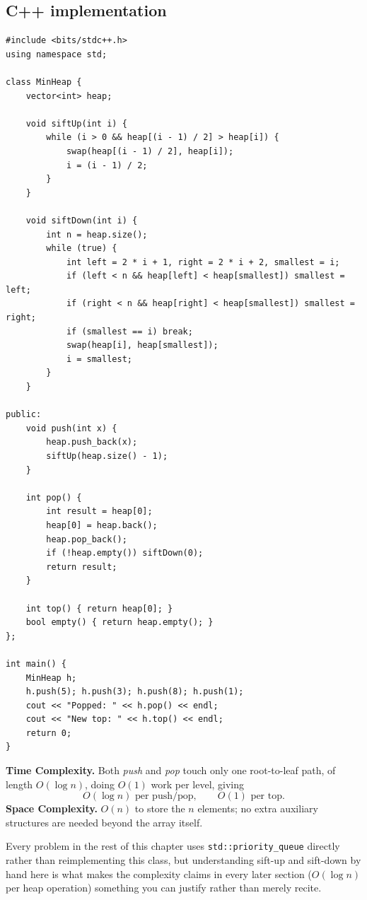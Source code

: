 \subsection*{C++ implementation}

\begin{lstlisting}
#include <bits/stdc++.h>
using namespace std;

class MinHeap {
    vector<int> heap;

    void siftUp(int i) {
        while (i > 0 && heap[(i - 1) / 2] > heap[i]) {
            swap(heap[(i - 1) / 2], heap[i]);
            i = (i - 1) / 2;
        }
    }

    void siftDown(int i) {
        int n = heap.size();
        while (true) {
            int left = 2 * i + 1, right = 2 * i + 2, smallest = i;
            if (left < n && heap[left] < heap[smallest]) smallest = left;
            if (right < n && heap[right] < heap[smallest]) smallest = right;
            if (smallest == i) break;
            swap(heap[i], heap[smallest]);
            i = smallest;
        }
    }

public:
    void push(int x) {
        heap.push_back(x);
        siftUp(heap.size() - 1);
    }

    int pop() {
        int result = heap[0];
        heap[0] = heap.back();
        heap.pop_back();
        if (!heap.empty()) siftDown(0);
        return result;
    }

    int top() { return heap[0]; }
    bool empty() { return heap.empty(); }
};

int main() {
    MinHeap h;
    h.push(5); h.push(3); h.push(8); h.push(1);
    cout << "Popped: " << h.pop() << endl;
    cout << "New top: " << h.top() << endl;
    return 0;
}
\end{lstlisting}

\begin{complexitybox}
\textbf{Time Complexity.} Both \textit{push} and \textit{pop} touch only
one root-to-leaf path, of length $O(\log n)$, doing $O(1)$ work per level,
giving
\[
  O(\log n) \text{ per push/pop}, \qquad O(1) \text{ per top}.
\]
\textbf{Space Complexity.} $O(n)$ to store the $n$ elements; no extra
auxiliary structures are needed beyond the array itself.
\end{complexitybox}

\begin{takeawaybox}
Every problem in the rest of this chapter uses \texttt{std::priority\_queue}
directly rather than reimplementing this class, but understanding sift-up
and sift-down by hand here is what makes the complexity claims in every
later section ($O(\log n)$ per heap operation) something you can justify
rather than merely recite.
\end{takeawaybox}
